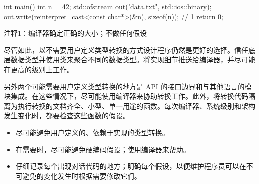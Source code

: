 
\begin{cpp}
int main() {
  int n = 42;
  std::ofstream out("data.txt", std::ios::binary);
  out.write(reinterpret_cast<const char*>(&n),
    sizeof(n)); // 1
  return 0;
}
\end{cpp}

{\footnotesize
注释1：编译器确定正确的大小；不做任何假设
}

尽管如此，以不需要用户定义类型转换的方式设计程序仍然是更好的选择。信任底层数据类型并使用类来聚合不同的数据类型。将实现细节推送给编译器，并尽可能在更高的级别上工作。

另外两个可能需要用户定义类型转换的地方是 API 的接口边界和与其他语言的模块集成。在这些情况下，尽可能使用编译器来协助转换工作。此外，将转换代码隔离为执行转换的文档齐全、小型、单一用途的函数。每次编译器、系统级别和架构发生变化时，都要检查这些函数的假设。


\begin{itemize}
\item
尽可能避免用户定义的、依赖于实现的类型转换。

\item
在需要时，尽可能避免硬编码假设；使用编译器来帮助。

\item
仔细记录每个出现对话代码的地方；明确每个假设，以便维护程序员可以在不可避免的变化发生时根据需要修改它们。
\end{itemize}










